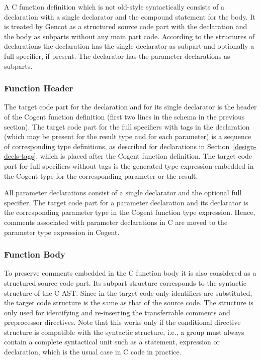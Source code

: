 A C function definition which is not old-style syntactically consists of a declaration with a single declarator
and the compound statement for the body.
It is treated by Gencot as a structured source code part with the declaration and the body as subparts
without any main part code. According to the structures of declarations the declaration has the single declarator as subpart
and optionally a full specifier, if present. The declarator has the parameter declarations as subparts.

\subsubsection{Function Header}

The target code part for the declaration and for its single declarator is the header of the Cogent function definition
(first two lines in the schema in the previous section). The target code part for the full specifiers with tags in
the declaration (which may be present for the result type and for each parameter) is a sequence of corresponding 
type definitions, as described for declarations in Section~\ref{design-decls-tags}, which is placed 
after the Cogent function definition. The target code part for full specifiers without tags is the generated type
expression embedded in the Cogent type for the corresponding parameter or the result.

All parameter declarations consist of a single declarator and the optional full specifier. The target code part for
a parameter declaration and its declarator is the corresponding parameter type in the Cogent function type expression.
Hence, comments associated with parameter declarations in C are moved to the parameter type expression in Cogent.

\subsubsection{Function Body}

To preserve comments embedded in the C function body it is also considered as a structured source code part. Its 
subpart structure corresponds to the syntactic structure of the C AST. Since in the target code only identifiers 
are substituted, the target code
structure is the same as that of the source code. The structure is only used for identifying and re-inserting
the transferrable comments and preprocessor directives. Note that this works only if the conditional directive 
structure is compatible with the syntactic structure, i.e., a group must always contain a complete syntactical
unit such as a statement, expression or declaration, which is the usual case in C code in practice.

